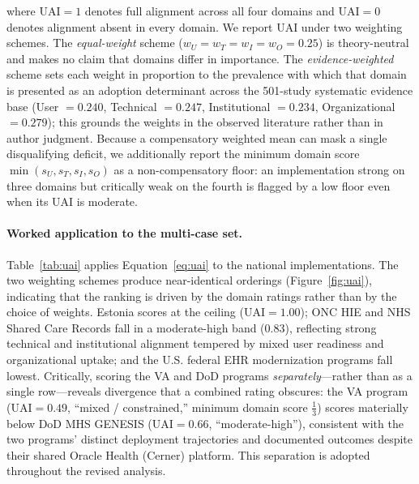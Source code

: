 where $\mathrm{UAI}=1$ denotes full alignment across all four domains and
$\mathrm{UAI}=0$ denotes alignment absent in every domain. We report UAI under two
weighting schemes. The \textit{equal-weight} scheme ($w_U=w_T=w_I=w_O=0.25$) is
theory-neutral and makes no claim that domains differ in importance. The
\textit{evidence-weighted} scheme sets each weight in proportion to the prevalence
with which that domain is presented as an adoption determinant across the
501-study systematic evidence base (User $=0.240$, Technical $=0.247$,
Institutional $=0.234$, Organizational $=0.279$); this grounds the weights in the
observed literature rather than in author judgment. Because a compensatory
weighted mean can mask a single disqualifying deficit, we additionally report the
minimum domain score $\min(s_U,s_T,s_I,s_O)$ as a non-compensatory floor: an
implementation strong on three domains but critically weak on the fourth is
flagged by a low floor even when its UAI is moderate.

\paragraph{Worked application to the multi-case set.} Table~\ref{tab:uai} applies
Equation~\ref{eq:uai} to the national implementations. The two weighting schemes
produce near-identical orderings (Figure~\ref{fig:uai}), indicating that the
ranking is driven by the domain ratings rather than by the choice of weights.
Estonia scores at the ceiling ($\mathrm{UAI}=1.00$); ONC HIE and NHS Shared Care
Records fall in a moderate-high band ($0.83$), reflecting strong technical and
institutional alignment tempered by mixed user readiness and organizational
uptake; and the U.S. federal EHR modernization programs fall lowest. Critically,
scoring the VA and DoD programs \textit{separately}---rather than as a single
row---reveals divergence that a combined rating obscures: the VA program
($\mathrm{UAI}=0.49$, ``mixed / constrained,'' minimum domain score $\tfrac{1}{3}$)
scores materially below DoD MHS GENESIS ($\mathrm{UAI}=0.66$, ``moderate-high''),
consistent with the two programs' distinct deployment trajectories and documented
outcomes despite their shared Oracle Health (Cerner) platform. This separation is
adopted throughout the revised analysis.

